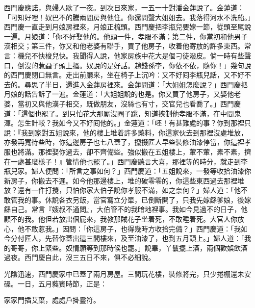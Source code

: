 西門慶應諾，與婦人歇了一夜。到次日來家，一五一十對潘金蓮說了。金蓮道：「可知好哩！奴巴不的騰兩間房與他住。你還問聲大姐姐去。我落得河水不洗船。」西門慶一直走到月娘房裡來，月娘正梳頭。西門慶把李瓶兒要嫁一節，從頭至尾說一遍。月娘道：「你不好娶他的。{}他頭一件，孝服不滿；第二件，你當初和他男子漢相交；第三件，你又和他老婆有聯手，買了他房子，收着他寄放的許多東西。{}常言：機兒不快梭兒快。我聞得人說，他家房族中花大是個刁徒潑皮。倘一時有些聲口，倒沒的惹蝨子頭上搔。{}奴說的是好話。趙錢孫李，你依不依，隨你！」{}幾句說的西門慶閉口無言。走出前廳來，坐在椅子上沉吟：{}又不好囘李瓶兒話，又不好不去的。尋思了半日，還進入金蓮房裡來。{}金蓮問道：「大姐姐怎麼說？」西門慶把月娘的話告訴了一遍。金蓮道：「大姐姐說的也是。{}你又買了他房子，又娶他老婆，當初又與他漢子相交，既做朋友，沒絲也有寸，交官兒也看喬了。」西門慶道：「這個也罷了。{}到只怕花大那厮沒圈子跳，知道挾制他孝服不滿，在中間鬼渾。怎生計較？我如今又不好囘他的。」金蓮道：「呸！有甚難處的事？你到那裡只說：『我到家對五姐說來，他的樓上堆着許多藥料，你這家伙去到那裡沒處堆放，亦發再寬待些時，你這邊房子也七八蓋了，攛掇匠人早些裝修油漆停當，你這裡孝服也將滿。那裡娶你過去，卻不齊備些。強似搬在五姐樓上，葷不葷，素不素，擠在一處甚麼樣子！』管情他也罷了。」西門慶聽言大喜，那裡等的時分，就走到李瓶兒家。婦人便問：「所言之事如何？」西門慶道：「五姐說來，一發等收拾油漆你新房子，你搬去不遲。如今他那邊樓上，堆的破零零的，你這些東西過去那裡堆放？還有一件打攪，只怕你家大伯子說你孝服不滿，{}如之奈何？」婦人道：「他不敢管我的事。休說各衣另飯，當官寫立分單，已倒斷開了，只我先嫁繇爹娘，後嫁繇自己。常言『嫂叔不通問』，大伯管不的我暗地裡事。我如今見過不的日子，他顧不的我。他但若放出個屁來，我教那賊花子坐着死，不敢睡着死。大官人你放心，他不敢惹我。」因問：「你這房子，也得幾時方收拾完備？」西門慶道：「我如今分付匠人，先替你蓋出這三間樓來，及至油漆了，也到五月頭上。」婦人道：「我的哥哥，你上緊些。奴情願等到那時候也罷。」說畢，丫鬟擺上酒，兩個歡娛飲酒過夜。西門慶自此，沒三五日不來，俱不必細說。

光陰迅速，西門慶家中已蓋了兩月房屋。三間玩花樓，裝修將完，只少捲棚還未安磉。一日，五月蕤賓時節，正是：

\begin{myquote}
家家門插艾葉，處處戶掛靈符。
\end{myquote}


